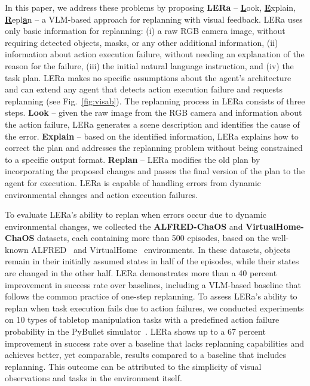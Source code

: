\documentclass[letterpaper, 10 pt, conference]{ieeeconf}  %
\begin{document}
In this paper, we address these problems by proposing \textbf{LERa} -- \textbf{\underline{L}}ook, \textbf{\underline{E}}xplain, \textbf{\underline{R}}epl\textbf{\underline{a}}n -- a VLM-based approach for replanning with visual feedback. LERa uses only basic information for replanning: (i) a raw RGB camera image, without requiring detected objects, masks, or any other additional information, (ii) information about action execution failure, without needing an explanation of the reason for the failure, (iii) the initial natural language instruction, and (iv) the task plan. LERa makes no specific assumptions about the agent’s architecture and can extend any agent that detects action execution failure and requests replanning (see Fig.~\ref{fig:visab}). The replanning process in LERa consists of three steps. \textbf{Look} -- given the raw image from the RGB camera and information about the action failure, LERa generates a scene description and identifies the cause of the error. \textbf{Explain} -- based on the identified information, LERa explains how to correct the plan and addresses the replanning problem without being constrained to a specific output format. \textbf{Replan} -- LERa modifies the old plan by incorporating the proposed changes and passes the final version of the plan to the agent for execution. LERa is capable of handling errors from dynamic environmental changes and action execution failures.

To evaluate LERa's ability to replan when errors occur due to dynamic environmental changes, we collected the \textbf{ALFRED-ChaOS} and \textbf{VirtualHome-ChaOS} datasets, each containing more than 500 episodes, based on the well-known ALFRED~\cite{shridhar2020alfred} and VirtualHome~\cite{puig2018virtualhome} environments. In these datasets, objects remain in their initially assumed states in half of the episodes, while their states are changed in the other half. LERa demonstrates more than a 40 percent improvement in success rate over baselines, including a VLM-based baseline that follows the common practice of one-step replanning. To assess LERa's ability to replan when task execution fails due to action failures, we conducted experiments on 10 types of tabletop manipulation tasks with a predefined action failure probability in the PyBullet simulator~\cite{coumans2021}. LERa shows up to a 67 percent improvement in success rate over a baseline that lacks replanning capabilities and achieves better, yet comparable, results compared to a baseline that includes replanning. This outcome can be attributed to the simplicity of visual observations and tasks in the environment itself.
\end{document}
